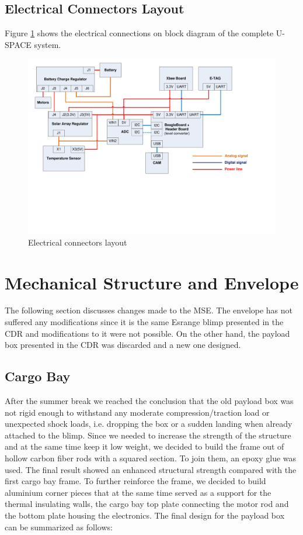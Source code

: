 \subsection{Electrical Connectors Layout}
Figure \ref{fig:Electrical_Connections} shows the electrical connections on block diagram of the complete U-SPACE system.
%
\begin{figure}[h!]
\centering
\includegraphics[width=\textwidth]{figures/fig_Electrical_Connections_Layout}
\caption{Electrical connectors layout}
\label{fig:Electrical_Connections}
\end{figure}


\section{Mechanical Structure and Envelope}

The following section discusses changes made to the \ac{MSE}. The envelope has not suffered any modifications since it is the same Esrange blimp presented in the CDR and modifications to it were not possible. On the other hand, the payload box presented in the CDR was discarded and a new one designed. 

\subsection{Cargo Bay}
After the summer break we reached the conclusion that the old payload box was not rigid enough to withstand any moderate compression/traction load or unexpected shock loads, i.e. dropping the box or a sudden landing when already attached to the blimp.  Since we needed to increase the strength of the structure and at the same time keep it low weight, we decided to build the frame out of hollow carbon fiber rods with a squared section. To join them, an epoxy glue was used. 
The final result showed an enhanced structural strength compared with the first cargo bay frame. To further reinforce the frame, we decided to build aluminium corner pieces that at the same time served as a support for the thermal insulating walls, the cargo bay top plate connecting the motor rod and the bottom plate housing the electronics. The final design for the payload box can be summarized as follows:

